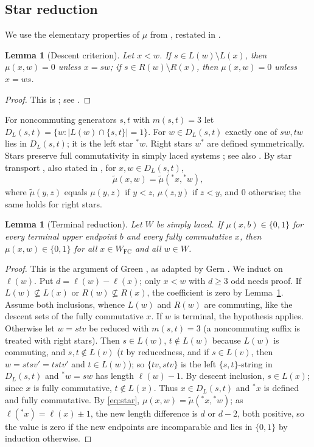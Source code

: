 \documentclass[10pt]{article}
\newtheorem{lemma}[theorem]{Lemma}
\theoremstyle{remark}
\newcommand{\FC}{W_{\mathrm{FC}}}
\begin{document}
\subsection{Star reduction}
We use the elementary properties of $\mu$ from \cite[\S2.3 and
Theorem~4.2]{KL}, restated in \cite[Proposition~1.2.4]{Gern}.
\begin{lemma}[Descent criterion]\label{lem:descent}
Let $x<w$. If $s\in L(w)\setminus L(x)$, then $\mu(x,w)=0$ unless $x=sw$;
if $s\in R(w)\setminus R(x)$, then $\mu(x,w)=0$ unless $x=ws$.
\end{lemma}
\begin{proof}
This is \cite[(2.3.e) and (2.3.f)]{KL}; see
\cite[Proposition~1.2.4(3),(4)]{Gern}.
\end{proof}
For noncommuting generators $s,t$ with $m(s,t)=3$ let
$D_L(s,t)=\{w:|L(w)\cap\{s,t\}|=1\}$. For $w\in D_L(s,t)$ exactly one of
$sw,tw$ lies in $D_L(s,t)$; it is the left star ${}^*w$. Right stars
$w^*$ are defined symmetrically. Stars preserve full commutativity in
simply laced systems \cite[Introduction]{GreenStar}; see also
\cite[Proposition~1.1.29]{Gern}.
By star transport \cite[Theorem~4.2]{KL}, also stated in
\cite[Proposition~1.2.4(1),(2)]{Gern}, for $x,w\in D_L(s,t)$,
\begin{equation}\label{eq:star}
 \widetilde\mu(x,w)=\widetilde\mu({}^*x,{}^*w),
\end{equation}
where $\widetilde\mu(y,z)$ equals $\mu(y,z)$ if $y<z$, $\mu(z,y)$ if
$z<y$, and $0$ otherwise; the same holds for right stars.

\begin{lemma}[Terminal reduction]\label{lem:reduction}
Let $W$ be simply laced. If $\mu(x,b)\in\{0,1\}$ for every terminal upper
endpoint $b$ and every fully commutative $x$, then $\mu(x,w)\in\{0,1\}$
for all $x\in\FC$ and all $w\in W$.
\end{lemma}
\begin{proof}
This is the argument of Green \cite[proof of Theorem~3.1 (published
Theorem~4.1)]{GreenLeading}, as adapted by Gern \cite[Lemma~2.3.10 and
Theorem~4.5.11]{Gern}. We induct on $\ell(w)$. Put $d=\ell(w)-\ell(x)$;
only $x<w$ with $d\geq3$ odd needs proof. If $L(w)\not\subseteq L(x)$ or
$R(w)\not\subseteq R(x)$, the coefficient is zero by
Lemma~\ref{lem:descent}. Assume
both inclusions, whence $L(w)$ and $R(w)$ are commuting, like the descent
sets of the fully commutative $x$. If $w$ is terminal, the hypothesis
applies. Otherwise let $w=stv$ be reduced with $m(s,t)=3$ (a noncommuting
suffix is treated with right stars). Then $s\in L(w)$, $t\notin L(w)$
because $L(w)$ is commuting, and $s,t\notin L(v)$ ($t$ by reducedness, and
if $s\in L(v)$, then $w=stsv'=tstv'$ and $t\in L(w)$); so $\{tv,stv\}$
is the left $\{s,t\}$-string in $D_L(s,t)$ and ${}^*w=sw$ has length
$\ell(w)-1$. By descent inclusion, $s\in L(x)$; since $x$ is fully
commutative, $t\notin L(x)$. Thus $x\in D_L(s,t)$ and ${}^*x$ is
defined and fully commutative. By \eqref{eq:star}, $\mu(x,w)=\widetilde\mu({}^*x,{}^*w)$; as
$\ell({}^*x)=\ell(x)\pm1$, the new length difference is $d$ or $d-2$, both
positive, so the value is zero if the new endpoints are incomparable and
lies in $\{0,1\}$ by induction otherwise.
\end{proof}
\end{document}
